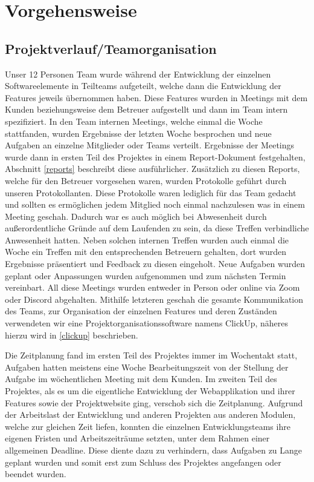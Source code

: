 \documentclass[12pt,a4paper]{scrartcl}
\begin{document}
\section{Vorgehensweise}

\subsection{Projektverlauf/Teamorganisation}
Unser 12 Personen Team wurde während der Entwicklung der einzelnen Softwareelemente in Teilteams aufgeteilt, welche dann die Entwicklung der Features jeweils übernommen haben.
Diese Features wurden in Meetings mit dem Kunden beziehungsweise dem Betreuer aufgestellt und dann im Team intern spezifiziert.
In den Team internen Meetings, welche einmal die Woche stattfanden, wurden Ergebnisse der letzten Woche besprochen und neue Aufgaben an einzelne Mitglieder oder Teams verteilt.
Ergebnisse der Meetings wurde dann in ersten Teil des Projektes in einem Report-Dokument festgehalten, Abschnitt \ref{reports} beschreibt diese ausführlicher.
Zusätzlich zu diesen Reports, welche für den Betreuer vorgesehen waren, wurden Protokolle geführt durch unseren Protokollanten.
Diese Protokolle waren lediglich für das Team gedacht und sollten es ermöglichen jedem Mitglied noch einmal nachzulesen was in einem Meeting geschah.
Dadurch war es auch möglich bei Abwesenheit durch außerordentliche Gründe auf dem Laufenden zu sein, da diese Treffen verbindliche Anwesenheit hatten.
Neben solchen internen Treffen wurden auch einmal die Woche ein Treffen mit den entsprechenden Betreuern gehalten, dort wurden Ergebnisse präsentiert und Feedback zu diesen eingeholt.
Neue Aufgaben wurden geplant oder Anpassungen wurden aufgenommen und zum nächsten Termin vereinbart.
All diese Meetings wurden entweder in Person oder online via Zoom oder Discord abgehalten.
Mithilfe letzteren geschah die gesamte Kommunikation des Teams, zur Organisation der einzelnen Features und deren Zuständen verwendeten wir eine Projektorganisationssoftware namens ClickUp, näheres hierzu wird in \ref{clickup} beschrieben.

Die Zeitplanung fand im ersten Teil des Projektes immer im Wochentakt statt, Aufgaben hatten meistens eine Woche Bearbeitungszeit von der Stellung der Aufgabe im wöchentlichen Meeting mit dem Kunden.
Im zweiten Teil des Projektes, als es um die eigentliche Entwicklung der Webapplikation und ihrer Features sowie der Projektwebsite ging, verschob sich die Zeitplanung.
Aufgrund der Arbeitslast der Entwicklung und anderen Projekten aus anderen Modulen, welche zur gleichen Zeit liefen, konnten die einzelnen Entwicklungsteams ihre eigenen Fristen und Arbeitszeiträume setzten, unter dem Rahmen einer allgemeinen Deadline.
Diese diente dazu zu verhindern, dass Aufgaben zu Lange geplant wurden und somit erst zum Schluss des Projektes angefangen oder beendet wurden.
\end{document}
